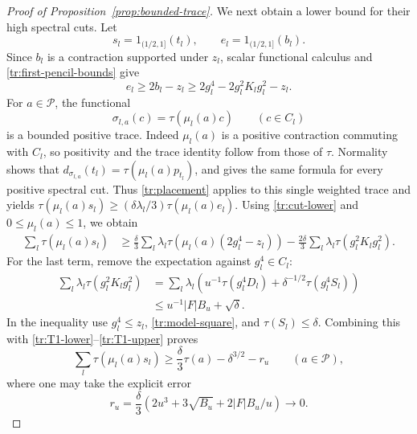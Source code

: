 \begin{proof}[Proof of Proposition~\ref{prop:bounded-trace}]
We next obtain a lower bound for their high spectral cuts.  Let
\[
 s_l=1_{(1/2,1]}(t_l),\qquad e_l=1_{(1/2,1]}(b_l).
\]
Since $b_l$ is a contraction supported under $z_l$, scalar functional
calculus and \eqref{tr:first-pencil-bounds} give
\begin{equation}\label{tr:cut-lower}
 e_l\geq2b_l-z_l\geq2g_l^4-2g_l^2K_lg_l^2-z_l.
\end{equation}
For $a\in\mathcal P$, the functional
\[
 \sigma_{l,a}(c)=\tau(\mu_l(a)c)\qquad(c\in C_l)
\]
is a bounded positive trace.  Indeed $\mu_l(a)$ is a positive
contraction commuting with $C_l$, so positivity and the trace identity
follow from those of $\tau$.  Normality shows that
$d_{\sigma_{l,a}}(t_l)=\tau(\mu_l(a)p_{t_l})$, and gives the same
formula for every positive spectral cut.  Thus
\eqref{tr:placement} applies to this single weighted trace and yields
$\tau(\mu_l(a)s_l)\geq(\delta\lambda_l/3)\tau(\mu_l(a)e_l)$.
Using \eqref{tr:cut-lower} and $0\leq\mu_l(a)\leq1$, we obtain
\begin{align}
 \sum_l\tau(\mu_l(a)s_l)
 &\geq \frac\delta3\sum_l\lambda_l
               \tau(\mu_l(a)(2g_l^4-z_l))
       -\frac{2\delta}{3}\sum_l\lambda_l\tau(g_l^2K_lg_l^2).
 \label{tr:weighted-mass}
\end{align}
For the last term, remove the expectation against $g_l^4\in C_l$:
\begin{align*}
 \sum_l\lambda_l\tau(g_l^2K_lg_l^2)
 &=\sum_l\lambda_l\left(u^{-1}\tau(g_l^4D_l)
                   +\delta^{-1/2}\tau(g_l^4S_l)\right)\\
 &\leq u^{-1}|F|B_u+\sqrt\delta.
\end{align*}
In the inequality use $g_l^4\leq z_l$, \eqref{tr:model-square}, and
$\tau(S_l)\leq\delta$.  Combining this with
\eqref{tr:T1-lower}--\eqref{tr:T1-upper} proves
\begin{equation}\label{tr:T3}
 \sum_l\tau(\mu_l(a)s_l)
 \geq\frac\delta3\tau(a)-\delta^{3/2}-r_u
 \qquad(a\in\mathcal P),
\end{equation}
where one may take the explicit error
\[
 r_u=\frac\delta3\left(2u^3+3\sqrt{B_u}
                          +2|F|B_u/u\right)\longrightarrow0.
\]


\end{proof}
